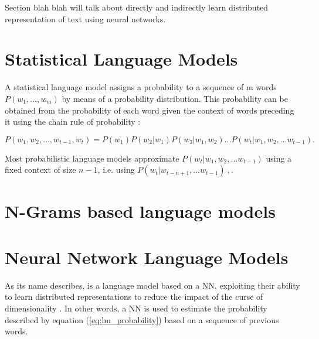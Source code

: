 Section blah blah will talk about directly and indirectly learn distributed
representation of text using neural networks.

\section{Statistical Language Models}
\label{sec:relwork-language-models}

A statistical language model assigns a probability to a sequence of m
words $P(w_1,\ldots,w_m)$ by means of a probability distribution. 
This probability can be obtained from the probability of
each word given the context of words preceding it using the chain rule of probability \cite{Bengio:2008}:

\begin{equation}
\label{eq:lm_probability}
 P(w_1, w_2, \ldots, w_{t-1},w_t) = P(w_1) P(w_2|w_1) P(w_3|w_1,w_2) \ldots 
  P(w_t | w_1, w_2, \ldots w_{t-1}).
\end{equation}

Most probabilistic language models  approximate $P(w_t | w_1, w_2, \ldots
w_{t-1})$ using a fixed context of size $n-1$, i.e. using  $P(w_t | w_{t-n+1}, \ldots w_{t-1})\ ,$.



\section{N-Grams based language models}
\label{sec:n-gram-lm}




\section{Neural Network Language Models}
\label{sec:nnlms-intro}

As its name describes, is a language model based on a \ac{NN}, exploiting their
ability to learn distributed representations to reduce the impact of the
curse of dimensionality \cite{Bengio:2008}. In other words, a \ac{NN} is
used to estimate the probability described  by equation (\ref{eq:lm_probability}) based on a sequence of
previous words.

